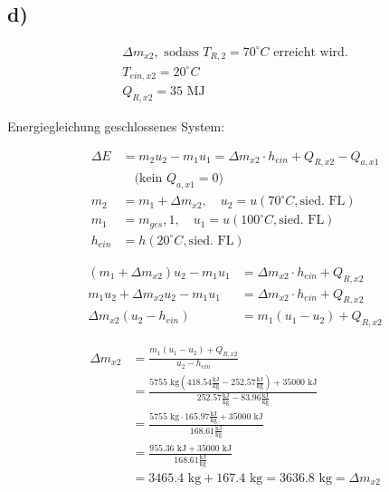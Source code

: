 

\subsection*{d)}

\begin{align*}
    \Delta m_{x2}, \text{ sodass } T_{R,2} = 70^\circ C \text{ erreicht wird.} \\
    T_{ein, x2} = 20^\circ C \\
    Q_{R, x2} = 35 \text{ MJ}
\end{align*}

Energiegleichung geschlossenes System:

\begin{align*}
    \Delta E &= m_2 u_2 - m_1 u_1 = \Delta m_{x2} \cdot h_{ein} + Q_{R, x2} - Q_{a, x1} \\
    &\quad \text{(kein } Q_{a, x1} = 0) \\
    m_2 &= m_1 + \Delta m_{x2}, \quad u_2 = u(70^\circ C, \text{sied. FL}) \\
    m_1 &= m_{ges}, 1, \quad u_1 = u(100^\circ C, \text{sied. FL}) \\
    h_{ein} &= h(20^\circ C, \text{sied. FL})
\end{align*}

\begin{align*}
    (m_1 + \Delta m_{x2}) u_2 - m_1 u_1 &= \Delta m_{x2} \cdot h_{ein} + Q_{R, x2} \\
    m_1 u_2 + \Delta m_{x2} u_2 - m_1 u_1 &= \Delta m_{x2} \cdot h_{ein} + Q_{R, x2} \\
    \Delta m_{x2} (u_2 - h_{ein}) &= m_1 (u_1 - u_2) + Q_{R, x2}
\end{align*}

\begin{align*}
    \Delta m_{x2} &= \frac{m_1 (u_1 - u_2) + Q_{R, x2}}{u_2 - h_{ein}} \\
    &= \frac{5755 \text{ kg} \left( 418.54 \frac{\text{kJ}}{\text{kg}} - 252.57 \frac{\text{kJ}}{\text{kg}} \right) + 35000 \text{ kJ}}{252.57 \frac{\text{kJ}}{\text{kg}} - 83.96 \frac{\text{kJ}}{\text{kg}}} \\
    &= \frac{5755 \text{ kg} \cdot 165.97 \frac{\text{kJ}}{\text{kg}} + 35000 \text{ kJ}}{168.61 \frac{\text{kJ}}{\text{kg}}} \\
    &= \frac{955.36 \text{ kJ} + 35000 \text{ kJ}}{168.61 \frac{\text{kJ}}{\text{kg}}} \\
    &= 3465.4 \text{ kg} + 167.4 \text{ kg} = 3636.8 \text{ kg} = \Delta m_{x2}
\end{align*}